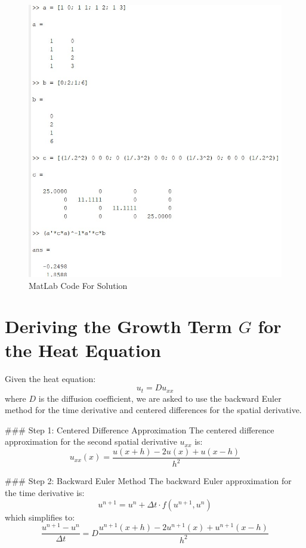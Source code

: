 \documentclass[11pt]{article}
\begin{document}
\begin{figure}[!ht]
  \centering
  \includegraphics[width= 1 \textwidth]{images/prob2.jpg}
  \caption{MatLab Code For Solution}
  \label{fig:1}
\end{figure}
\FloatBarrier

\section{Deriving the Growth Term \( G \) for the Heat Equation}

Given the heat equation:
\[
u_t = D u_{xx}
\]
where \( D \) is the diffusion coefficient, we are asked to use the backward Euler method for the time derivative and centered differences for the spatial derivative.

### Step 1: Centered Difference Approximation
The centered difference approximation for the second spatial derivative \( u_{xx} \) is:
\[
u_{xx}(x) = \frac{u(x+h) - 2u(x) + u(x-h)}{h^2}
\]

### Step 2: Backward Euler Method
The backward Euler approximation for the time derivative is:
\[
u^{n+1} = u^n + \Delta t \cdot f(u^{n+1}, u^n)
\]
which simplifies to:
\[
\frac{u^{n+1} - u^n}{\Delta t} = D \frac{u^{n+1}(x+h) - 2u^{n+1}(x) + u^{n+1}(x-h)}{h^2}
\]
\end{document}
